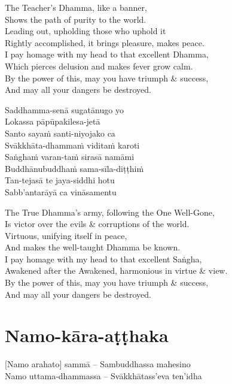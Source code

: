 \begin{english}
  The Teacher's Dhamma, like a banner,\\
  Shows the path of purity to the world.\\
  Leading out, upholding those who uphold it\\
  Rightly accomplished, it brings pleasure, makes peace.\\
  I pay homage with my head to that excellent Dhamma,\\
  Which pierces delusion and makes fever grow calm.\\
  By the power of this, may you have triumph \& success,\\
  And may all your dangers be destroyed.
\end{english}

Saddhamma-senā sugatānugo yo\\
Lokassa pāpūpakilesa-jetā\\
Santo sayaṁ santi-niyojako ca\\
Svākkhāta-dhammaṁ viditaṁ karoti\\
Saṅghaṁ varan-taṁ sirasā namāmi\\
Buddhānubuddhaṁ sama-sīla-diṭṭhiṁ\\
Tan-tejasā te jaya-siddhi hotu\\
Sabb'antarāyā ca vināsamentu

\begin{english}
  The True Dhamma's army, following the One Well-Gone,\\
  Is victor over the evils \& corruptions of the world.\\
  Virtuous, unifying itself in peace,\\
  And makes the well-taught Dhamma be known.\\
  I pay homage with my head to that excellent Saṅgha,\\
  Awakened after the Awakened, harmonious in virtue \& view.\\
  By the power of this, may you have triumph \& success,\\
  And may all your dangers be destroyed.
\end{english}

\suttaRef{[Thai]}

\section{Namo-kāra-aṭṭhaka}
\label{namo-kara-atthaka}
[Namo arahato] sammā – Sambuddhassa mahesino\\
Namo uttama-dhammassa – Svākkhātass'eva ten'idha

